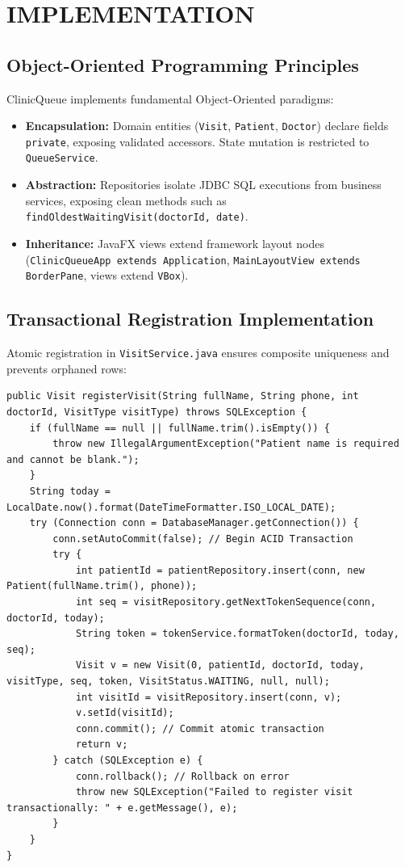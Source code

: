 \documentclass[12pt,a4paper,oneside]{report}
\begin{document}
\chapter{IMPLEMENTATION}

\section{Object-Oriented Programming Principles}
ClinicQueue implements fundamental Object-Oriented paradigms:
\begin{itemize}[leftmargin=0.8cm, itemsep=1pt]
    \item \textbf{Encapsulation:} Domain entities (\texttt{Visit}, \texttt{Patient}, \texttt{Doctor}) declare fields \texttt{private}, exposing validated accessors. State mutation is restricted to \texttt{QueueService}.
    \item \textbf{Abstraction:} Repositories isolate JDBC SQL executions from business services, exposing clean methods such as \texttt{findOldestWaitingVisit(doctorId, date)}.
    \item \textbf{Inheritance:} JavaFX views extend framework layout nodes (\texttt{ClinicQueueApp extends Application}, \texttt{MainLayoutView extends BorderPane}, views extend \texttt{VBox}).
\end{itemize}

\section{Transactional Registration Implementation}
Atomic registration in \texttt{VisitService.java} ensures composite uniqueness and prevents orphaned rows:
\begin{lstlisting}[style=JavaStyle, caption={Transactional Visit Registration in VisitService.java}]
public Visit registerVisit(String fullName, String phone, int doctorId, VisitType visitType) throws SQLException {
    if (fullName == null || fullName.trim().isEmpty()) {
        throw new IllegalArgumentException("Patient name is required and cannot be blank.");
    }
    String today = LocalDate.now().format(DateTimeFormatter.ISO_LOCAL_DATE);
    try (Connection conn = DatabaseManager.getConnection()) {
        conn.setAutoCommit(false); // Begin ACID Transaction
        try {
            int patientId = patientRepository.insert(conn, new Patient(fullName.trim(), phone));
            int seq = visitRepository.getNextTokenSequence(conn, doctorId, today);
            String token = tokenService.formatToken(doctorId, today, seq);
            Visit v = new Visit(0, patientId, doctorId, today, visitType, seq, token, VisitStatus.WAITING, null, null);
            int visitId = visitRepository.insert(conn, v);
            v.setId(visitId);
            conn.commit(); // Commit atomic transaction
            return v;
        } catch (SQLException e) {
            conn.rollback(); // Rollback on error
            throw new SQLException("Failed to register visit transactionally: " + e.getMessage(), e);
        }
    }
}
\end{lstlisting}
\end{document}
